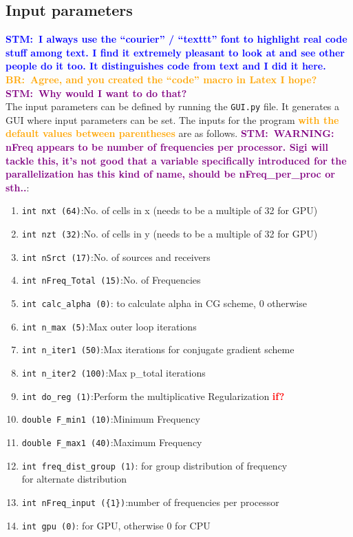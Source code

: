 \documentclass[10pt,a4paper]{article}
\newcommand{\commentstm}[1]{\textcolor{blue}{\textbf{STM:\ #1}}}
\newcommand{\commentstmtwo}[1]{\textcolor{purple}{\textbf{STM:\ #1}}}
\newcommand{\newstm}[1]{\textcolor{red}{\textbf{#1}}}
\newcommand{\newstmtwo}[1]{\textcolor{orange}{\textbf{#1}}}
\newcommand{\commentbr}[1]{\textcolor{orange}{\textbf{BR:\ #1}}}
\begin{document}
\subsection{Input parameters}
\commentstm{I always use the ``courier'' / ``texttt'' font to
highlight real code stuff among text. I find it extremely pleasant to
look at and see other people do it too. It distinguishes code from
text and I did it here.}\\
\commentbr{Agree, and you created the ``code'' macro in Latex I hope?}\\
\commentstmtwo{Why would I want to do that?}\\
The input parameters can be defined by running the \texttt{GUI.py} file. It
generates a GUI where input parameters can be set.
The inputs for the program \newstmtwo{with the default values between
parentheses} are as follows.
\commentstmtwo{WARNING: nFreq appears to be number of frequencies per
processor. Sigi will tackle this, it's not good that a
variable specifically introduced for the parallelization has this kind
of name, should be nFreq\_per\_proc or sth..}:
\begin{enumerate}
    \item \texttt{int nxt (64)}:\tab No. of cells in x (needs to be a
multiple of 32 for GPU)
    \item \texttt{int nzt (32)}:\tab No. of cells in y (needs to be a
multiple of 32 for GPU)
    \item \texttt{int nSrct (17)}:\tab No. of sources and receivers
    \item \texttt{int nFreq\_Total\ (15)}:\tab No. of Frequencies
    \item \texttt{int calc\_alpha\ (0)}: to calculate alpha in
CG scheme, 0 otherwise
    \item \texttt{int n\_max (5)}:\tab Max outer loop iterations
    \item \texttt{int n\_iter1 (50)}:\tab Max iterations for conjugate
gradient scheme
    \item \texttt{int n\_iter2 (100)}:\tab Max p\_total iterations
    \item \texttt{int do\_reg (1)}:\tab Perform the multiplicative
Regularization \newstm{if?}
    \item \texttt{double F\_min1 (10)}:\tab Minimum Frequency
    \item \texttt{double F\_max1 (40)}:\tab Maximum Frequency
    \item \texttt{int freq\_dist\_group (1)}: for group
distribution of frequency\\ \tab {} for alternate distribution
    \item \texttt{int nFreq\_input (\{1\})}:\tab number of frequencies
per processor
    \item\texttt{int gpu (0)}: for GPU, otherwise 0 for CPU
\end{enumerate}
\end{document}
